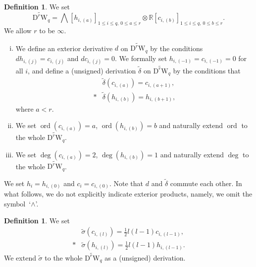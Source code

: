 \documentclass[12pt]{amsart}
\newcommand{\R}{{\mathbb R}}
\newcommand{\W}{\mathrm{W}}
\newcommand{\D}{\mathrm{D}}
\DeclareMathOperator{\ord}{\mathrm{ord}}
\theoremstyle{definition}
\newtheorem{definition}[theorem]{Definition}
\theoremstyle{remark}
\begin{document}
\begin{definition}
We set
\[
\widetilde{\D^r\W}_q=\bigwedge[h_{i,(a)}]_{1\leq i\leq q,\ 0\leq a\leq r}\otimes\R[c_{i,(b)}]_{1\leq i\leq q,\ 0\leq b\leq r}.
\]
We allow $r$ to be $\infty$.
\begin{enumerate}[i)]
\item
We define an exterior derivative $d$ on $\widetilde{\D^r\W}_q$ by the conditions $dh_{i,(j)}=c_{i,(j)}$ and $dc_{i,(j)}=0$.
We formally set $h_{i,(-1)}=c_{i,(-1)}=0$ for all $i$, and define a (unsigned) derivation $\widetilde\delta$ on $\widetilde{\D^r\W}_q$ by the conditions that
\begin{align*}
&\widetilde{\delta}(c_{i,(a)})=c_{i,(a+1)},\\*
&\widetilde{\delta}(h_{i,(b)})=h_{i,(b+1)},
\end{align*}
where $a<r$.
\item
We set $\ord(c_{i,(a)})=a$, $\ord(h_{i,(b)})=b$ and naturally extend $\ord$ to the whole $\widetilde{\D^r\W}_q$.
\item
We set $\deg(c_{i,(a)})=2$, $\deg(h_{i,(b)})=1$ and naturally extend $\deg$ to the whole $\widetilde{\D^r\W}_q$.
\end{enumerate}
\end{definition}
We set $h_i=h_{i,(0)}$ and $c_i=c_{i,(0)}$.
Note that $d$ and $\widetilde{\delta}$ commute each other.
In what follows, we do not explicitly indicate exterior products, namely, we omit the symbol~`$\wedge$'.

\begin{definition}
We set
\begin{align*}
&\widetilde\sigma(c_{i,(l)})=\frac12l(l-1)c_{i,(l-1)},\\*
&\widetilde\sigma(h_{i,(l)})=\frac12l(l-1)h_{i,(l-1)}.
\end{align*}
We extend $\widetilde\sigma$ to the whole $\widetilde{\D^r\W}_q$ as a (unsigned) derivation.
\end{definition}
\end{document}

